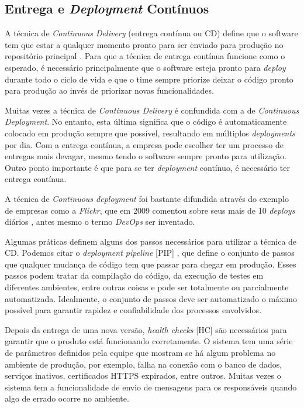 \subsection{Entrega e \emph{Deployment} Contínuos}

A técnica de \emph{Continuous Delivery} (entrega contínua ou CD) define que o software tem que estar a qualquer momento pronto para ser enviado para produção no repositório principal \cite{fowlerCD}. Para que a técnica de entrega contínua funcione como o esperado, é necessário principalmente que o software esteja pronto para \emph{deploy} durante todo o ciclo de vida e que o time sempre priorize deixar o código pronto para produção ao invés de priorizar novas funcionalidades.

Muitas vezes a técnica de \emph{Continuous Delivery} é confundida com a de \emph{Continuous Deployment}. No entanto, esta última significa que o código é automaticamente colocado em produção sempre que possível, resultando em múltiplos \emph{deployments} por dia. Com a entrega contínua, a empresa pode escolher ter um processo de entregas mais devagar, mesmo tendo o software sempre pronto para utilização. Outro ponto importante é que para se ter \emph{deployment} contínuo, é necessário ter entrega contínua.

A técnica de \emph{Continuous deployment} foi bastante difundida através do exemplo de empresas como a \emph{Flickr}, que em 2009 comentou sobre seus mais de 10 \emph{deploys} diários \cite{flickrTalk}, antes mesmo o termo \emph{DevOps} ser inventado. 

Algumas práticas definem alguns dos passos necessários para utilizar a técnica de CD. Podemos citar o \emph{deployment pipeline} [PIP] \cite{devopsBook}, que define o conjunto de passos que qualquer mudança de código tem que passar para chegar em produção. Esses passos podem tratar da compilação do código, da execução de testes em diferentes ambientes, entre outras coisas e pode ser totalmente ou parcialmente automatizada. Idealmente, o conjunto de passos deve ser automatizado o máximo possível para garantir rapidez e confiabilidade dos processos envolvidos.

Depois da entrega de uma nova versão, \emph{health checks} [HC] \cite{devopsBook} são necessários para garantir que o produto está funcionando corretamente. O sistema tem uma série de parâmetros definidos pela equipe que mostram se há algum problema no ambiente de produção, por exemplo, falha na conexão com o banco de dados, serviços inativos, certificados HTTPS expirados, entre outros. Muitas vezes o sistema tem a funcionalidade de envio de mensagens para os responsáveis quando algo de errado ocorre no ambiente.

